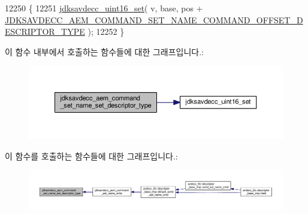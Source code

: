 \begin{DoxyCode}
12250 \{
12251     \hyperlink{group__endian_ga14b9eeadc05f94334096c127c955a60b}{jdksavdecc\_uint16\_set}( v, base, pos + 
      \hyperlink{group__command__set__name_ga91e53d5d14c37d26c62d74cada1323bf}{JDKSAVDECC\_AEM\_COMMAND\_SET\_NAME\_COMMAND\_OFFSET\_DESCRIPTOR\_TYPE}
       );
12252 \}
\end{DoxyCode}


이 함수 내부에서 호출하는 함수들에 대한 그래프입니다.\+:
\nopagebreak
\begin{figure}[H]
\begin{center}
\leavevmode
\includegraphics[width=350pt]{group__command__set__name_ga558417c3de2544b4d6588ba38bec27c7_cgraph}
\end{center}
\end{figure}




이 함수를 호출하는 함수들에 대한 그래프입니다.\+:
\nopagebreak
\begin{figure}[H]
\begin{center}
\leavevmode
\includegraphics[width=350pt]{group__command__set__name_ga558417c3de2544b4d6588ba38bec27c7_icgraph}
\end{center}
\end{figure}


